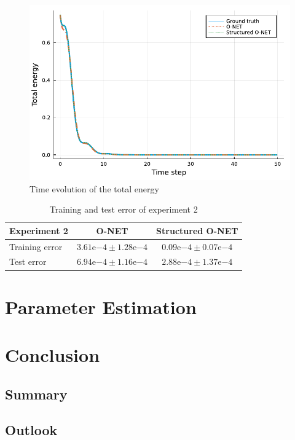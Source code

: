 \documentclass[
	parskip, 			   %
	twoside, 			   %
	DIV=14, 			   %
	BCOR=15.0mm, 		   %
	headsepline, 		   %
	open=right, 		   %
	captions=tableheading, %
	bibliography=totoc,    %
	numbers=noenddot       %
]{scrreprt}
\begin{document}
\begin{figure}[h!]
    \centering
    \includegraphics[scale=1]{figures/Hamiltonian_structured_O_NET_idho.pdf}
    \caption{Time evolution of the total energy}
    \label{fig:Hamiltonian_error_structured_O_NET_idho}
\end{figure}

\begin{table}[h!]
	\centering
	\caption{Training and test error of experiment 2}
	\label{tab:error_experiment2}
	\begin{tabularx}{\textwidth}{lcc}
		\toprule
		\textbf{Experiment 2} & \textbf{O-NET} & \textbf{Structured O-NET}\\
		\midrule
		Training error & $3.61\mathrm{e}{-4} \pm 1.28\mathrm{e}{-4}$ & $0.09\mathrm{e}{-4} \pm 0.07\mathrm{e}{-4}$ \\
		Test error & $6.94\mathrm{e}{-4} \pm 1.16\mathrm{e}{-4}$ & $2.88\mathrm{e}{-4} \pm 1.37\mathrm{e}{-4}$ \\
		\bottomrule
	\end{tabularx}
\end{table}

\clearpage
\chapter{Parameter Estimation}
\label{ch:chapter7}

\clearpage
\chapter{Conclusion}
\label{ch:chapter8}
\section{Summary}
\section{Outlook}



\renewcommand{\bibname}{References} %



\appendix
\end{document}
